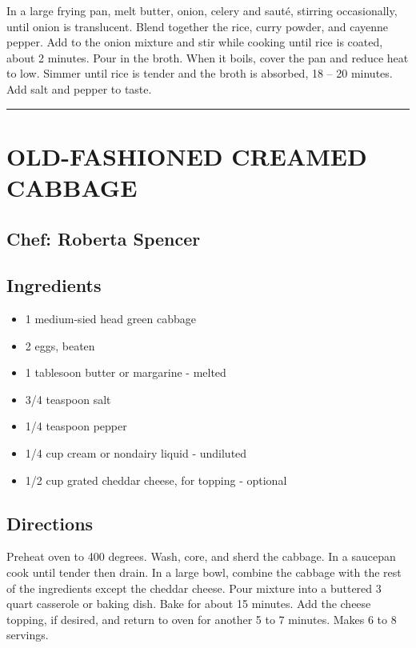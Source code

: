 \documentclass[
]{book}
\providecommand{\tightlist}{%
  \setlength{\itemsep}{0pt}\setlength{\parskip}{0pt}}
\begin{document}
In a large frying pan, melt butter, onion, celery and sauté, stirring
occasionally, until onion is translucent. Blend together the rice, curry
powder, and cayenne pepper. Add to the onion mixture and stir while
cooking until rice is coated, about 2 minutes. Pour in the broth. When it boils,
cover the pan and reduce heat to low. Simmer until rice is tender and the broth
is absorbed, 18 -- 20 minutes. Add salt and pepper to taste.

\begin{center}\rule{0.5\linewidth}{0.5pt}\end{center}

\hypertarget{old-fashioned-creamed-cabbage}{%
\section*{OLD-FASHIONED CREAMED CABBAGE}\label{old-fashioned-creamed-cabbage}}


\hypertarget{chef-roberta-spencer-8}{%
\subsection*{Chef: Roberta Spencer}\label{chef-roberta-spencer-8}}


\hypertarget{ingredients-34}{%
\subsection*{Ingredients}\label{ingredients-34}}


\begin{itemize}
\tightlist
\item
  1 medium-sied head green cabbage
\item
  2 eggs, beaten
\item
  1 tablesoon butter or margarine - melted
\item
  3/4 teaspoon salt
\item
  1/4 teaspoon pepper
\item
  1/4 cup cream or nondairy liquid - undiluted
\item
  1/2 cup grated cheddar cheese, for topping - optional
\end{itemize}

\hypertarget{directions-34}{%
\subsection*{Directions}\label{directions-34}}


Preheat oven to 400 degrees. Wash, core, and sherd the cabbage. In a saucepan
cook until tender then drain.
In a large bowl, combine the cabbage with the rest of the ingredients
except the cheddar cheese. Pour mixture into a buttered 3 quart casserole
or baking dish. Bake for about 15 minutes. Add the cheese topping,
if desired, and return to oven for another 5 to 7 minutes. Makes 6 to 8 servings.
\end{document}
